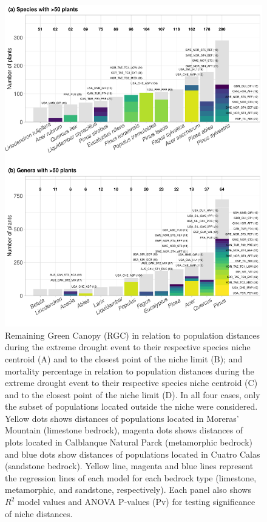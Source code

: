 \documentclass[11pt,twoside]{reedthesis}
\begin{document}
\setlength{\abovecaptionskip}{10pt}
\begin{figure}[hbt!]

{\centering \includegraphics[width=1\linewidth]{figure/CH3/figure3} 

}

\caption[Remaining Green Canopy (RGC) and mortality in relation to population distances to species niche]{Remaining Green Canopy (RGC) in relation to population distances during the extreme drought event to their respective species niche centroid (A) and to the closest point of the niche limit (B); and mortality percentage in relation to population distances during the extreme drought event to their respective species niche centroid (C) and to the closest point of the niche limit (D). In all four cases, only the subset of populations located outside the niche were considered. Yellow dots shows distances of populations located in Moreras’ Mountain (limestone bedrock), magenta dots shows distances of plots located in Calblanque Natural Parck (metamorphic bedrock) and blue dots show distances of populations located in Cuatro Calas (sandstone bedrock). Yellow line, magenta and blue lines represent the regression lines of each model for each bedrock type (limestone, metamorphic, and sandstone, respectively). Each panel also shows $R^2$ model values and ANOVA P-values (Pv) for testing significance of niche distances.}\label{fig:Ch3plot3}
\end{figure}
\end{document}
